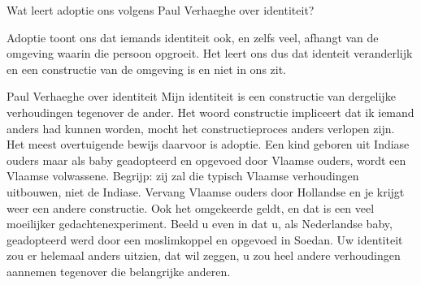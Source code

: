 \documentclass[main.tex]{subfiles}
\begin{document}
\begin{examenvraag}
    \begin{vraag}
        Wat leert adoptie ons volgens Paul Verhaeghe over identiteit?
    \end{vraag}

    \begin{antwoord}
        Adoptie toont ons dat iemands identiteit ook, en zelfs veel, afhangt van de omgeving waarin die persoon opgroeit. Het leert ons dus dat identeit veranderlijk en een constructie van de omgeving is en niet in ons zit.
        \begin{citaat}{Paul Verhaeghe over identiteit}
            Mijn identiteit is een constructie van dergelijke verhoudingen tegenover de ander.
            Het woord constructie impliceert dat ik iemand anders had kunnen worden, mocht het constructieproces anders verlopen zijn.
            Het meest overtuigende bewijs daarvoor is adoptie.
            Een kind geboren uit Indiase ouders maar als baby geadopteerd en opgevoed door Vlaamse ouders, wordt een Vlaamse volwassene.
            Begrijp: zij zal die typisch Vlaamse verhoudingen uitbouwen, niet de Indiase.
            Vervang Vlaamse ouders door Hollandse en je krijgt weer een andere constructie.
            Ook het omgekeerde geldt, en dat is een veel moeilijker gedachtenexperiment.
            Beeld u even in dat u, als Nederlandse baby, geadopteerd werd door een moslimkoppel en opgevoed in Soedan. 
            Uw identiteit zou er helemaal anders uitzien, dat wil zeggen, u zou heel andere verhoudingen aannemen tegenover die belangrijke anderen.
        \end{citaat}
    \end{antwoord}
\end{examenvraag}
\end{document}
